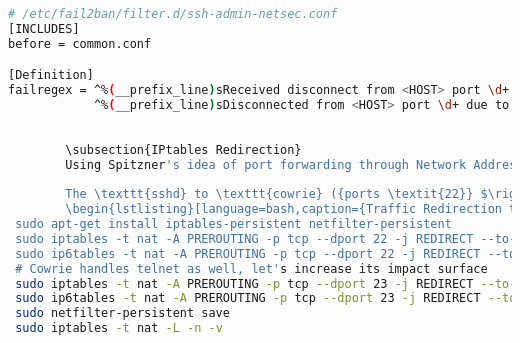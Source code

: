 \documentclass{cls/ULBreport}
\begin{document}
        \begin{lstlisting}[language=bash,caption={Regex Filter Against Key-Based Attacks}]
 # /etc/fail2ban/filter.d/ssh-admin-netsec.conf
[INCLUDES]
before = common.conf

[Definition]
failregex = ^%(__prefix_line)sReceived disconnect from <HOST> port \d+: Too many authentication failures
            ^%(__prefix_line)sDisconnected from <HOST> port \d+ due to: Authentication failed for .* publickey\end{lstlisting}
        
        
        \subsection{IPtables Redirection}
        Using Spitzner's idea of port forwarding through Network Address Translation (NAT) (Ch.12), all traffic to the standard SSH port (22) is re-routed to the Cowrie honeypot on port 2222. This helps separate the malicious activity from the legitimate usage taking place on port 61001, and helps support Spitzner's idea of compartmentalization to separate the honeypot from the production systems and avoid any conflicts (Ch.12). Additionally, our group collaborators' IP addresses could be whitelisted for a much tighter defense. 
        
        The \texttt{sshd} to \texttt{cowrie} ({ports \textit{22}} $\rightarrow$ \textit{2222}) redirection is a security design with multiple benefits: both processes avoid conflicting with each other as they can restart separately, binding to high ports does not require root privileges, also, \texttt{fail2ban} needs an explicit target to be effective. Compartmentalization is a key principle for any deceptive operation, we also ensure an appropriate foundation for clean and comprehensive post-attack analysis.
        \begin{lstlisting}[language=bash,caption={Traffic Redirection to Cowrie}]
 sudo apt-get install iptables-persistent netfilter-persistent
 sudo iptables -t nat -A PREROUTING -p tcp --dport 22 -j REDIRECT --to-port 2222
 sudo ip6tables -t nat -A PREROUTING -p tcp --dport 22 -j REDIRECT --to-port 2222
 # Cowrie handles telnet as well, let's increase its impact surface
 sudo iptables -t nat -A PREROUTING -p tcp --dport 23 -j REDIRECT --to-port 2323
 sudo ip6tables -t nat -A PREROUTING -p tcp --dport 23 -j REDIRECT --to-port 2323
 sudo netfilter-persistent save
 sudo iptables -t nat -L -n -v\end{lstlisting}
        
\end{document}
